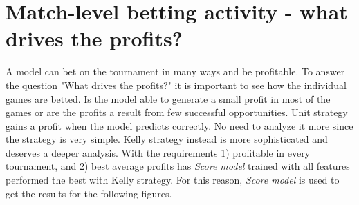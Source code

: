 \section{Match-level betting activity - what drives the profits?}
A model can bet on the tournament in many ways and be profitable. To answer the question "What drives the profits?" it is important to see how the individual games are betted. Is the model able to generate a small profit in most of the games or are the profits a result from few successful opportunities. Unit strategy gains a profit when the model predicts correctly. No need to analyze it more since the strategy is very simple. Kelly strategy instead is more sophisticated and deserves a deeper analysis. With the requirements 1) profitable in every tournament, and 2) best average profits has \textit{Score model} trained with all features performed the best with Kelly strategy. For this reason, \textit{Score model} is used to get the results for the following figures.

